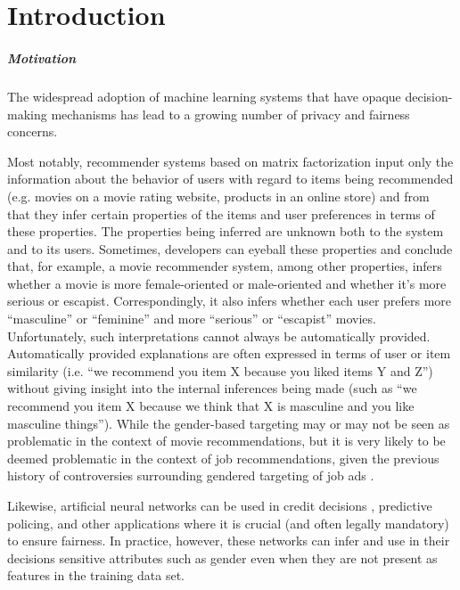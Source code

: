 \chapter{Introduction}

\paragraph{Motivation}

The widespread adoption of machine learning systems that have opaque
decision-making mechanisms has lead to a growing number of privacy and fairness
concerns.

Most notably, recommender systems based on matrix factorization
input only the information about the behavior of users with regard to items
being recommended (e.g. movies on a movie rating website, products in an
online store) and from that they infer certain properties of the items and
user preferences in terms of these properties\cite{facebook-cf}. The properties
being inferred are unknown both to the system and to its users. Sometimes,
developers can eyeball these properties and conclude that, for example, a movie
recommender system, among other properties, infers whether a movie is more
female-oriented or male-oriented and whether it's more serious or escapist.
Correspondingly, it also infers whether each user prefers more ``masculine'' or
``feminine'' and more ``serious'' or ``escapist'' movies\cite{koren2009matrix}.
Unfortunately, such interpretations cannot always be automatically provided.
Automatically provided explanations are often expressed in terms of user or
item similarity (i.e. ``we recommend you item X because you liked items Y and
Z'') without giving insight into the internal inferences being made (such as
``we recommend you item X because we think that X is masculine and you like
masculine things''). While the gender-based targeting may or may not be seen as
problematic in the context of movie recommendations, but it is very likely to be
deemed problematic in the context of job recommendations, given the previous
history of controversies surrounding gendered targeting of job ads
\cite{datta_tschantz_datta_2015}.

Likewise, artificial neural networks can be used in credit decisions
\cite{WEST20001131}, predictive policing\cite{Seo2018PartiallyGN}, and other
applications where it is crucial (and often legally mandatory) to ensure
fairness. In practice, however, these networks can infer and use in their
decisions sensitive attributes such as gender even when they are not present
as features in the training data set\cite{Beutel2017DataDA}.

